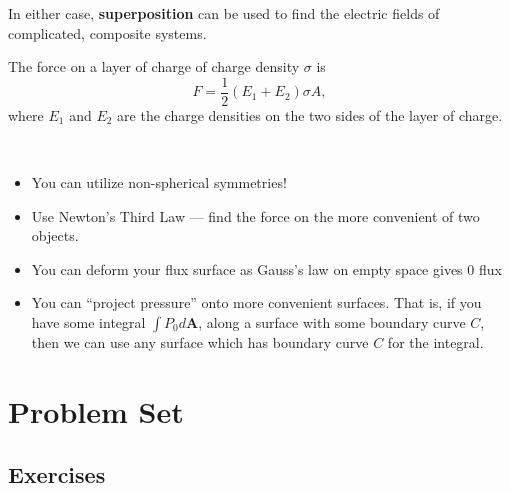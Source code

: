 \documentclass[11pt]{scrartcl}
\begin{document}
In either case, \textbf{superposition} can be used to find the electric fields of complicated, composite systems.
\begin{theorem}
    The force on a layer of charge of charge density $\sigma$ is
    $$F = \frac 12 (E_1 + E_2)\sigma A,$$where $E_1$ and $E_2$ are the charge densities on the two sides of the layer of charge.
\end{theorem}
\begin{tip}$~$
\vspace{-5mm}
    \begin{itemize}
        \item You can utilize non-spherical symmetries!
        \item Use Newton’s Third Law — find the force on the more convenient of two objects.
        \item You can deform your flux surface as Gauss’s law on empty space gives 0 flux
        \item You can “project pressure” onto more convenient surfaces. That is, if you have some integral $\int P_0 d\mathbf A$, along a surface with some boundary curve $C$, then we can use any surface which has boundary curve $C$ for the integral.
    \end{itemize}
\end{tip}




\section{Problem Set}

\subsection{Exercises}
\end{document}
